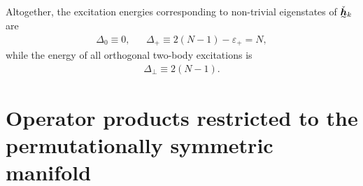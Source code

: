\documentclass[nofootinbib,notitlepage,11pt]{revtex4-2}
\newcommand{\p}[1]{\left(#1\right)} %
\newcommand{\m}{\bm} %
\newcommand{\1}{\mathds{1}}
\newcommand{\ut}{\undertilde}
\begin{document}
Altogether, the excitation energies corresponding to non-trivial
eigenstates of $\ut{\check{\m h}}_k$ are
\begin{align}
  \Delta_0 \equiv 0,
  &&
  \Delta_+ \equiv 2\p{N-1} - \varepsilon_+ = N,
\end{align}
while the energy of all orthogonal two-body excitations is
\begin{align}
  \Delta_\perp \equiv 2\p{N-1}.
\end{align}

\section{Operator products restricted to the permutationally symmetric
  manifold}
\label{sec:sym_prod}
\end{document}
